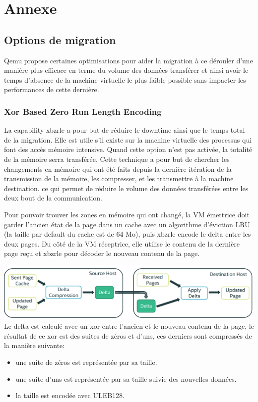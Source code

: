 \newpage
\section*{Annexe}
\subsection*{Options de migration}
Qemu propose certaines optimisations pour aider la migration à ce dérouler d'une manière plus efficace en terme du volume des données transférer et ainsi avoir le temps d'absence de la machine virtuelle le plus faible possible sans impacter les performances de cette dernière.

\subsubsection*{Xor Based Zero Run Length Encoding}
La capability xbzrle a pour but de réduire le downtime ainsi que le temps total de la migration.
Elle est utile s'il existe sur la machine virtuelle des processus qui font des accès mémoire intensive.
Quand cette option n'est pas activée, la totalité de la mémoire serra transférée.
Cette technique a pour but de chercher les changements en mémoire qui ont été faits depuis la dernière itération de la transmission de la mémoire, les compresser, et les transmettre à la machine destination.
ce qui permet de réduire le volume des données transférées entre les deux bout de la communication.

Pour pouvoir trouver les zones en mémoire qui ont changé, la VM émettrice doit garder l'ancien état de la page dans un cache
avec un algorithme d'éviction LRU (la taille par default du cache est de 64 Mo), puis xbzrle encode le delta entre
les deux pages.
Du côté de la VM réceptrice, elle utilise le contenu de la dernière page reçu et xbzrle pour décoder le nouveau contenu de la page.

\includegraphics[width=\textwidth]{include/xbzrle}
Le delta est calculé avec un xor entre l'ancien et le nouveau contenu de la page, le résultat de ce xor est des suites de zéros et d'uns,
ces derniers sont compressés de la manière suivante:

\begin{itemize}
    \item une suite de zéros est représentée par sa taille.
    \item une suite d'uns est représentée par sa taille suivie des nouvelles données.
    \item la taille est encodée avec ULEB128.
\end{itemize}
